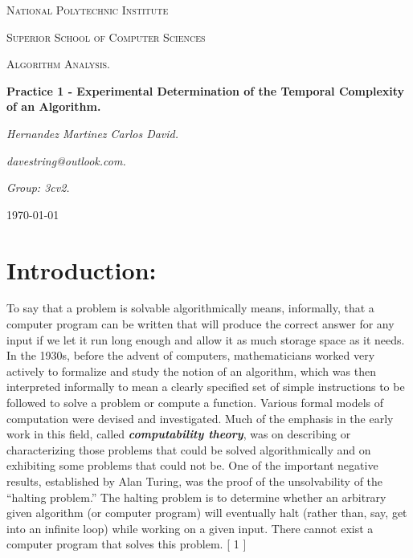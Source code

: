 \documentclass[10pt,a4paper]{article}
\begin{document}
\begin{titlepage}
	\centering
	{ \huge \scshape National Polytechnic Institute\par}
	{ \Large \scshape  Superior School of Computer Sciences\par }
	\vspace{1cm}
	{\scshape\Large Algorithm Analysis.\par}
	\vspace{1.5cm}
	{\Huge\bfseries Practice 1 - Experimental Determination of the Temporal Complexity of an Algorithm.\par}
	\vspace{2cm}
	{\Large\itshape Hernandez Martinez Carlos David.\par}
	{\Large\itshape davestring@outlook.com.\par}
	{\Large\itshape Group: 3cv2. \par}
	\vfill
	{\large \today\par} 
	\vfill
\end{titlepage}

\renewcommand\lstlistingname{Quelltext} 


\tableofcontents 
{}
\pagebreak

\section{Introduction:}

To say that a problem is solvable algorithmically means, informally, that a computer program
can be written that will produce the correct answer for any input if we let it run long
enough and allow it as much storage space as it needs. In the 1930s, before the advent of
computers, mathematicians worked very actively to formalize and study the notion of an
algorithm, which was then interpreted informally to mean a clearly specified set of simple
instructions to be followed to solve a problem or compute a function. Various formal
models of computation were devised and investigated. Much of the emphasis in the early
work in this field, called {\bfseries\itshape computability theory}, was on describing or characterizing those
problems that could be solved algorithmically and on exhibiting some problems that could
not be. One of the important negative results, established by Alan Turing, was the proof
of the unsolvability of the “halting problem.” The halting problem is to determine whether
an arbitrary given algorithm (or computer program) will eventually halt (rather than, say,
get into an infinite loop) while working on a given input. There cannot exist a computer
program that solves this problem. [ 1 ] \hfill \break
\end{document}
